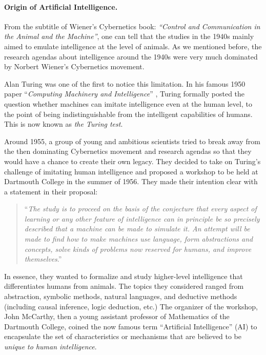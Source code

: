 \documentclass[\toplevelprefix/book-main.tex]{subfiles}
\begin{document}
\paragraph{Origin of Artificial Intelligence.}
From the subtitle of Wiener's Cybernetics book: {\em ``Control and Communication in the Animal and the Machine''}, one can tell that the studies in the 1940s mainly aimed to emulate intelligence at the level of animals. As we mentioned before, the research agendas about intelligence around the 1940s were very much dominated by Norbert Wiener's Cybernetics movement. 

Alan Turing was one of the first to notice this limitation. In his famous 1950 paper ``{\em Computing Machinery and Intelligence}'' \cite{Turing-1950}, Turing formally posted the question whether machines can imitate intelligence even at the human level, to the point of being indistinguishable from the intelligent capabilities of humans. This is now known as {\em the Turing test}. 

Around 1955, a group of young and ambitious scientists tried to break away from the then dominating Cybernetics movement and research agendas so that they would have a chance to create their own legacy. They decided to take on Turing's challenge of imitating human intelligence and proposed a workshop to be held at Dartmouth College in the summer of 1956. They made their intention clear with a statement in their proposal: 
\begin{quote}
    ``{\em The study is to proceed on the basis of the conjecture that every aspect of learning or any other feature of intelligence can in principle be so precisely described that a machine can be made to simulate it. An attempt will be made to find how to make machines use language, form abstractions and concepts, solve kinds of problems now reserved for humans, and improve themselves}.'' 
\end{quote}
In essence, they wanted to formalize and study higher-level intelligence that differentiates humans from animals. The topics they considered ranged from abstraction, symbolic methods, natural languages, and deductive methods (including causal inference, logic deduction, etc.) The organizer of the workshop, John McCarthy, then a young assistant professor of Mathematics of the Dartmouth College, coined the now famous term ``Artificial Intelligence'' (AI) to encapsulate the set of characteristics or mechanisms that are believed to be {\em unique to human intelligence}. 
\end{document}
